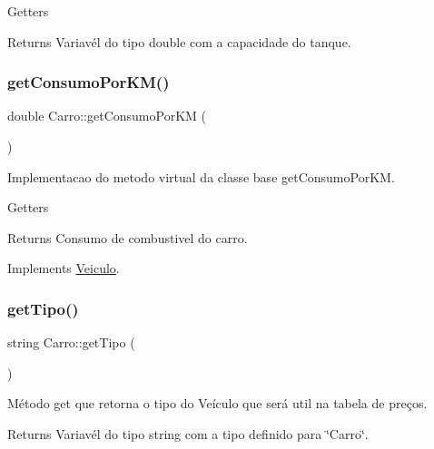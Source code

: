 Getters \begin{DoxyReturn}{Returns}
Variavél do tipo double com a capacidade do tanque. 
\end{DoxyReturn}
\mbox{\label{classCarro_ac0fa548c440f6db12b86b4b3d347e5bb}} 
\subsubsection{\texorpdfstring{get\+Consumo\+Por\+K\+M()}{getConsumoPorKM()}}
{\footnotesize\ttfamily double Carro\+::get\+Consumo\+Por\+KM (\begin{DoxyParamCaption}{ }\end{DoxyParamCaption})\hspace{0.3cm}{\ttfamily [virtual]}}



Implementacao do metodo virtual da classe base \textquotesingle{}get\+Consumo\+Por\+KM\textquotesingle{}. 

Getters

\begin{DoxyReturn}{Returns}
Consumo de combustivel do carro. 
\end{DoxyReturn}


Implements \hyperlink{classVeiculo}{Veiculo}.

\mbox{\label{classCarro_a98987e2932fe7ee4051b426b74c7d9cc}} 
\subsubsection{\texorpdfstring{get\+Tipo()}{getTipo()}}
{\footnotesize\ttfamily string Carro\+::get\+Tipo (\begin{DoxyParamCaption}{ }\end{DoxyParamCaption})\hspace{0.3cm}{\ttfamily [virtual]}}



Método get que retorna o tipo do Veículo que será util na tabela de preços. 

\begin{DoxyReturn}{Returns}
Variavél do tipo string com a tipo definido para \char`\"{}\+Carro\char`\"{}. 
\end{DoxyReturn}


